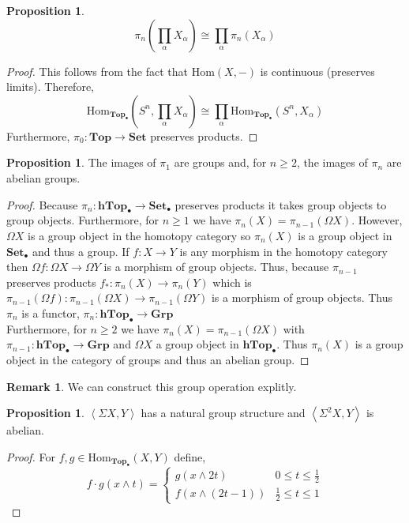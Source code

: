 \documentclass[12pt]{extarticle}
\newcommand{\Hom}[2]{\mathrm{Hom}\left( #1, #2 \right)}
\newcommand{\catHom}[3]{\mathrm{Hom}_{#1}\left( #2, #3 \right)}
\newcommand{\Top}{\mathbf{Top}}
\newcommand{\pTop}{\mathbf{Top}_{\bullet}}
\newcommand{\Set}{\mathbf{Set}}
\newcommand{\pSet}{\mathbf{Set}_\bullet}
\newcommand{\phTop}{\mathbf{hTop}_{\bullet}}
\newcommand{\Grp}{\mathbf{Grp}}
\theoremstyle{definition}
\newtheorem{proposition}[theorem]{Proposition}
\newtheorem{remark}{Remark}
\begin{document}
\begin{proposition}
\[\pi_n \left( \prod_\alpha X_\alpha \right) \cong \prod_{\alpha} \pi_n(X_\alpha)\]
\end{proposition}

\begin{proof}
This follows from the fact that $\Hom{X}{-}$ is continuous (preserves limits). Therefore,
\[ \catHom{\pTop}{S^n}{\prod_{\alpha} X_{\alpha}} \cong \prod_{\alpha} \catHom{\pTop}{S^n}{X_{\alpha}} \]
Furthermore, $\pi_0 : \Top \to \Set$ preserves products. 
\end{proof}

\begin{proposition}
The images of $\pi_1$ are groups and, for $n \ge 2$, the images of $\pi_n$ are abelian groups. 
\end{proposition}

\begin{proof}
Because $\pi_n : \phTop \to \pSet$ preserves products it takes group objects to group objects. Furthermore, for $n \ge 1$ we have $\pi_n(X) = \pi_{n-1}(\Omega X)$. However, $\Omega X$ is a group object in the homotopy category so $\pi_n(X)$ is a group object in $\pSet$ and thus a group. If $f : X \to Y$ is any morphism in the homotopy category then $\Omega f : \Omega X \to \Omega Y$ is a morphism of group objects. Thus, because $\pi_{n-1}$ preserves products $f_* : \pi_n(X) \to \pi_n(Y)$ which is $\pi_{n-1}(\Omega f) : \pi_{n-1}(\Omega X) \to \pi_{n-1}(\Omega Y)$ is a morphism of group objects. Thus $\pi_n$ is a functor, $\pi_n : \phTop \to \Grp$
\bigskip\\
Furthermore, for $n \ge 2$ we have $\pi_n(X) = \pi_{n-1}(\Omega X)$ with $\pi_{n-1} : \phTop \to \Grp$ and $\Omega X$ a group object in $\phTop$. Thus $\pi_n(X)$ is a group object in the category of groups and thus an abelian group. 
\end{proof}

\begin{remark}
We can construct this group operation explitly.
\end{remark}

\begin{proposition}
$\left< \Sigma X, Y \right>$ has a natural group structure and $\left< \Sigma^2 X, Y \right>$ is abelian.
\end{proposition}

\begin{proof}
For $f,g \in \catHom{\pTop}{X}{Y}$ define, 
\[f \cdot g(x \wedge t) = 
\begin{cases}
g(x \wedge 2t) & 0 \le t \le \tfrac{1}{2} \\
f(x \wedge (2t - 1)) & \tfrac{1}{2} \le t \le 1
\end{cases}\]
\end{proof}
\end{document}
